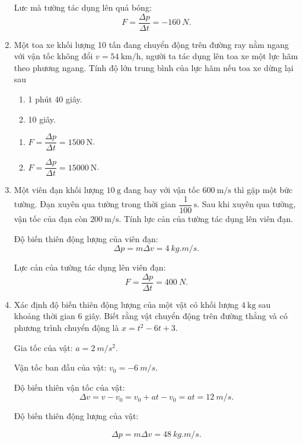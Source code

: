 \begin{enumerate}[label=\bfseries Câu \arabic*:]
{		Lưc mà tường tác dụng lên quả bóng: $$F=\dfrac{\Delta p}{\Delta t} = \SI{-160}{N}.$$
	}
	\item {}
	
	
	{
		Một toa xe khối lượng 10 tấn đang chuyển động trên đường ray nằm ngang với vận tốc không đổi $v=\SI{54}{\kilo\meter/\hour}$, người ta tác dụng lên toa xe một lực hãm theo phương ngang. Tính độ lớn trung bình của lực hãm nếu toa xe dừng lại sau
		\begin{enumerate}[label=\alph*)]
			\item 1 phút 40 giây.
			\item 10 giây.
		\end{enumerate}
	}
	
	\hideall
	{	
		\begin{enumerate}[label=\alph*)]
			\item $F=\dfrac{\Delta p}{\Delta t}=\SI{1500}{\newton}$.
			\item $F=\dfrac{\Delta p}{\Delta t}=\SI{15000}{\newton}$.
		\end{enumerate}
	}
	\item {}
	
	
	{
		Một viên đạn khối lượng $\SI{10}{\gram}$ đang bay với vận tốc $\SI{600}{\meter/\second}$ thì gặp một bức tường. Đạn xuyên qua tường trong thời gian $\dfrac{1}{100}\,\text{s}$. Sau khi xuyên qua tường, vận tốc của đạn còn $\SI{200}{\meter/\second}$. Tính lực cản của tường tác dụng lên viên đạn.
	}
	
	\hideall
	{	
		Độ biến thiên động lượng của viên đạn:
		$$\Delta p = m\Delta v = \SI{4}{kg.m/s}.$$
		
		Lực cản của tường tác dụng lên viên đạn: $$F=\dfrac{\Delta p}{\Delta t} = \SI{400}{N}.$$
	}
	\item {}
	
	
	{
		Xác định độ biến thiên động lượng của một vật có khối lượng $\SI{4}{\kilogram}$ sau khoảng thời gian 6 giây. Biết rằng vật chuyển động trên đường thẳng và có phương trình chuyển động là $x=t^2-6t+3$.
	}
	
	\hideall
	{	
		Gia tốc của vật: $a=\SI{2}{m/s^2}$.
		
		Vận tốc ban đầu của vật: $v_0 = \SI{-6}{m/s}$.
		
		Độ biến thiên vận tốc của vật:
		$$\Delta v = v-v_0 = v_0+at-v_0=at = \SI{12}{m/s}.$$
		
		Độ biến thiên động lượng của vật: 
		
		$$\Delta p = m\Delta v = \SI{48}{kg.m/s}.$$
	}
	

\end{enumerate}

